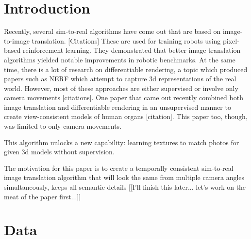 \documentclass{article}
\begin{document}

\section{Introduction}
	

Recently, several sim-to-real algorithms have come out that are based on image-to-image translation. [Citations]
These are used for training robots using pixel-based reinforcement learning.
They demonstrated that better image translation algorithms yielded notable improvements in robotic benchmarks.
At the same time, there is a lot of research on differentiable rendering,
a topic which produced papers such as NERF which attempt to capture 3d representations of the real world.
However, most of these approaches are either supervised or involve only camera movements [citations].
One paper that came out recently combined both image translation and differentiable rendering in an unsupervised manner to create view-consistent models of human organs [citation].
This paper too, though, was limited to only camera movements.

This algorithm unlocks a new capability: learning textures to match photos for given 3d models without supervision.

The motivation for this paper is to create a temporally consistent sim-to-real image translation algorithm that will look the same from multiple camera angles simultaneously, keeps all semantic details 
[[I'll finish this later... let's work on the meat of the paper first...]]

		



\section{Data}
\label{sec:data}
\end{document}
